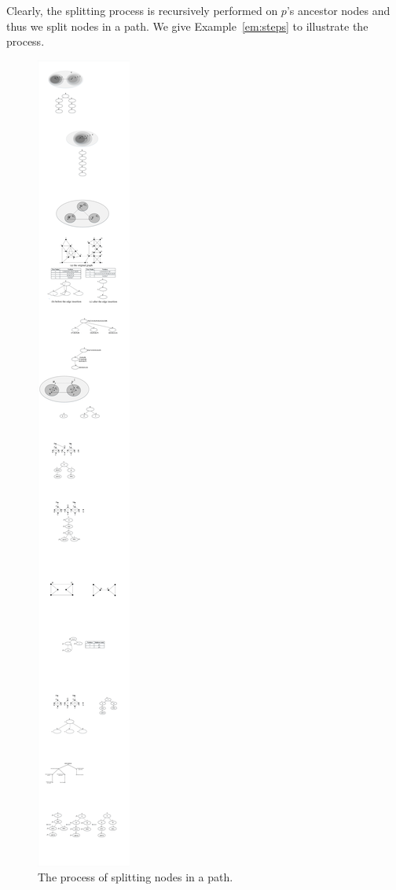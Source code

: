Clearly, the splitting process is recursively performed on $p$'s ancestor nodes and thus we split nodes in a path.
We give Example~\ref{em:steps} to illustrate the process.

\begin{figure}[ht]
    \centering
    \includegraphics[width=1\linewidth]{figures/steps}
    \caption{The process of splitting nodes in a path.}
    \label{fig:steps}
\end{figure}

